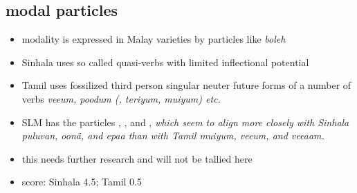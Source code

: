 \documentclass[a4paper,12pt]{article}
\begin{document}
\subsection{modal particles}
\begin{itemize}
 \item modality is expressed in Malay varieties by particles like \em boleh \em
 \item Sinhala uses so called quasi-verbs with limited inflectional potential \citep{Gair1970}
 \item Tamil uses fossilized third person singular neuter future forms of a number of verbs \em  vee\nz um, poodum (, teriyum, mu\dz iyum)  \em etc. \citep[84]{Lehmann1989tamil}
 \item SLM has the particles , ,   and , \em which seem to align more closely with Sinhala \em puluvan, oonä, \em  and \em epaa \em than with Tamil \em mu\dz iyum, vee\nz um, \em  and \em  vee\nz\dz aam.\em
\item this needs further research and will not be tallied here
 \item score: Sinhala 4.5; Tamil 0.5
\end{itemize}
\end{document}
